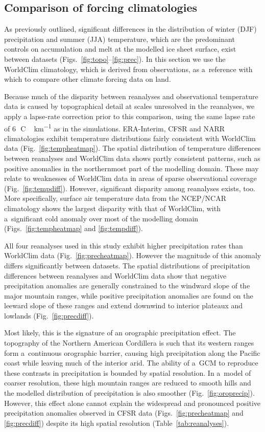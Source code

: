 \documentclass[tc, ms]{copernicus}
\begin{document}
\subsection{Comparison of forcing climatologies}

As previously outlined, significant differences in the distribution of winter (DJF) precipitation and summer (JJA) temperature, which are the predominant controls on accumulation and melt at the modelled ice sheet surface, exist between datasets (Figs.~\ref{fig:topo}--\ref{fig:prec}). In this section we use the WorldClim climatology, which is derived from observations, as a~reference with which to compare other climate forcing data on land.

Because much of the disparity between reanalyses and observational temperature data is caused by topographical detail at scales unresolved in the reanalyses, we apply a lapse-rate correction prior to this comparison, using the same lapse rate of 6\,\unit{{\degree}C\,km^{-1}} as in the simulations. ERA-Interim, CFSR and NARR climatologies exhibit temperature distributions fairly consistent with WorldClim data (Fig.~\ref{fig:tempheatmap}). The spatial distribution of temperature differences between reanalyses and WorldClim data shows partly consistent patterns, such as positive anomalies in the northernmost part of the modelling domain. These may relate to weaknesses of WorldClim data in areas of sparse observational coverage (Fig.~\ref{fig:tempdiff}). However, significant disparity among reanalyses exists, too. More specifically, surface air temperature data from the NCEP/NCAR climatology shows the largest disparity with that of WorldClim, with a~significant cold anomaly over most of the modelling domain (Figs.~\ref{fig:tempheatmap} and \ref{fig:tempdiff}).

All four reanalyses used in this study exhibit higher precipitation rates than WorldClim data (Fig.~\ref{fig:precheatmap}). However the magnitude of this anomaly differs significantly between datasets. The spatial distributions of precipitation differences between reanalyses and WorldClim data show that negative precipitation anomalies are generally constrained to the windward slope of the major mountain ranges, while positive precipitation anomalies are found on the leeward slope of these ranges and extend downwind to interior plateaux and lowlands (Fig.~\ref{fig:precdiff}).

Most likely, this is the signature of an orographic precipitation effect. The topography of the Northern American Cordillera is such that its western ranges form a~continuous orographic barrier, causing high precipitation along the Pacific coast while leaving much of the interior arid. The ability of a~GCM to reproduce these contrasts in precipitation is bounded by spatial resolution. In a~model of coarser resolution, these high mountain ranges are reduced to smooth hills and the modelled distribution of precipitation is also smoother (Fig.~\ref{fig:oroprecip}). However, this effect alone cannot explain the widespread and pronounced positive precipitation anomalies observed in CFSR data (Figs.~\ref{fig:precheatmap} and \ref{fig:precdiff}) despite its high spatial resolution (Table~\ref{tab:reanalyses}).
\end{document}
